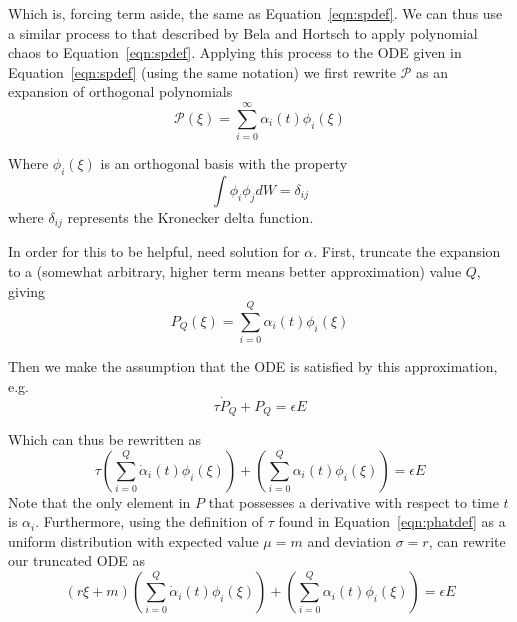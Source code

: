 \documentclass[12pt,letterpaper]{article}
\begin{document}
 Which is, forcing term aside, the same as Equation~\ref{eqn:spdef}. We can thus use a similar process to that described by Bela and Hortsch to apply polynomial chaos to Equation~\ref{eqn:spdef}. Applying this process to the ODE given in Equation~\ref{eqn:spdef} (using the same notation) we first rewrite $\mathcal{P}$ as an expansion of orthogonal polynomials
\begin{equation}
\mathcal{P}(\xi) = \sum_{i=0}^{\infty} \alpha_i (t) \phi_i (\xi)
\end{equation}

 Where $\phi_i (\xi)$ is an orthogonal basis with the property
\begin{equation} 
\int \phi_i \phi_j dW = \delta_{ij}
\label{eqn:delta}
\end{equation}
where $\delta_{ij}$ represents the Kronecker delta function.

In order for this to be helpful, need solution for $\alpha$. First, truncate the expansion to a (somewhat arbitrary, higher term means better approximation) value $Q$, giving
\begin{equation}
P_Q (\xi) = \sum_{i=0}^{Q} \alpha_i (t) \phi_i (\xi)
\end{equation}

Then we make the assumption that the ODE is satisfied by this approximation, e.g. 
\begin{equation}
\tau \dot{P}_Q + P_Q = \epsilon E
\end{equation}

Which can thus be rewritten as
\begin{equation}
\tau \left(\sum_{i=0}^{Q} \dot{\alpha}_i (t) \phi_i (\xi)\right) +
\left( \sum_{i=0}^{Q} \alpha_i (t) \phi_i (\xi)\right) = \epsilon E
\end{equation}
Note that the only element in $P$ that possesses a derivative with respect to time $t$ is $\alpha_i$. Furthermore, using the definition of $\tau$ found in Equation~\ref{eqn:phatdef} as a uniform distribution with expected value $\mu = m$ and deviation $\sigma = r$, can rewrite our truncated ODE as
\begin{equation}
(r \xi + m)\left(\sum_{i=0}^{Q} \dot{\alpha}_i (t) \phi_i (\xi)\right) +
\left( \sum_{i=0}^{Q} \alpha_i (t) \phi_i (\xi)\right) = \epsilon E
\label{eqn:star}
\end{equation}
\end{document}
